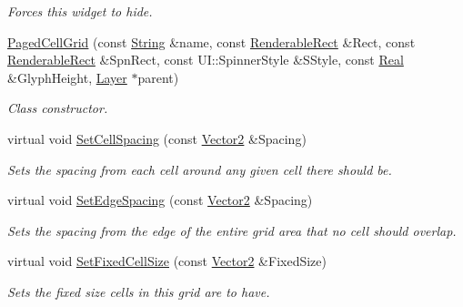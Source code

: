 \begin{DoxyCompactItemize}
\begin{DoxyCompactList}\small\item\em Forces this widget to hide. \item\end{DoxyCompactList}\item 
\hyperlink{classphys_1_1UI_1_1PagedCellGrid_a3038df62663e3ee8b860bd6f035af732}{PagedCellGrid} (const \hyperlink{namespacephys_aa03900411993de7fbfec4789bc1d392e}{String} \&name, const \hyperlink{structphys_1_1UI_1_1RenderableRect}{RenderableRect} \&Rect, const \hyperlink{structphys_1_1UI_1_1RenderableRect}{RenderableRect} \&SpnRect, const UI::SpinnerStyle \&SStyle, const \hyperlink{namespacephys_af7eb897198d265b8e868f45240230d5f}{Real} \&GlyphHeight, \hyperlink{classphys_1_1UI_1_1Layer}{Layer} $\ast$parent)
\begin{DoxyCompactList}\small\item\em Class constructor. \item\end{DoxyCompactList}\item 
virtual void \hyperlink{classphys_1_1UI_1_1PagedCellGrid_ad565437a52149f099c1757903f930723}{SetCellSpacing} (const \hyperlink{classphys_1_1Vector2}{Vector2} \&Spacing)
\begin{DoxyCompactList}\small\item\em Sets the spacing from each cell around any given cell there should be. \item\end{DoxyCompactList}\item 
virtual void \hyperlink{classphys_1_1UI_1_1PagedCellGrid_a1bfa7f6ebfc9cec285509f5ddb649f08}{SetEdgeSpacing} (const \hyperlink{classphys_1_1Vector2}{Vector2} \&Spacing)
\begin{DoxyCompactList}\small\item\em Sets the spacing from the edge of the entire grid area that no cell should overlap. \item\end{DoxyCompactList}\item 
virtual void \hyperlink{classphys_1_1UI_1_1PagedCellGrid_a0083810bb8c7857ef2b4e2ce40dbaa8d}{SetFixedCellSize} (const \hyperlink{classphys_1_1Vector2}{Vector2} \&FixedSize)
\begin{DoxyCompactList}\small\item\em Sets the fixed size cells in this grid are to have. \item\end{DoxyCompactList}\item 

\end{DoxyCompactItemize}
